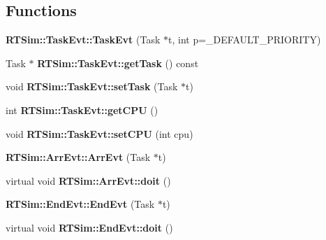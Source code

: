 \subsection*{Functions}
\begin{DoxyCompactItemize}
\item 
{\bfseries R\+T\+Sim\+::\+Task\+Evt\+::\+Task\+Evt} (Task $\ast$t, int p=\+\_\+\+D\+E\+F\+A\+U\+L\+T\+\_\+\+P\+R\+I\+O\+R\+I\+TY)\hypertarget{group__tasks_gacfc74e3c1903c6949275a254f1c1965f}{}\label{group__tasks_gacfc74e3c1903c6949275a254f1c1965f}

\item 
Task $\ast$ {\bfseries R\+T\+Sim\+::\+Task\+Evt\+::get\+Task} () const \hypertarget{group__tasks_gab1bac729570e6a83a603b7ebab6eaadd}{}\label{group__tasks_gab1bac729570e6a83a603b7ebab6eaadd}

\item 
void {\bfseries R\+T\+Sim\+::\+Task\+Evt\+::set\+Task} (Task $\ast$t)\hypertarget{group__tasks_ga019854b43c0548a0322cd12618aff533}{}\label{group__tasks_ga019854b43c0548a0322cd12618aff533}

\item 
int {\bfseries R\+T\+Sim\+::\+Task\+Evt\+::get\+C\+PU} ()\hypertarget{group__tasks_ga8035bdc8e6baa194d22ea1f368acbe98}{}\label{group__tasks_ga8035bdc8e6baa194d22ea1f368acbe98}

\item 
void {\bfseries R\+T\+Sim\+::\+Task\+Evt\+::set\+C\+PU} (int cpu)\hypertarget{group__tasks_ga5db1cc4b9325310784d8705ed49d1ced}{}\label{group__tasks_ga5db1cc4b9325310784d8705ed49d1ced}

\item 
{\bfseries R\+T\+Sim\+::\+Arr\+Evt\+::\+Arr\+Evt} (Task $\ast$t)\hypertarget{group__tasks_ga42754b618a61ab5e10a39d65adf09586}{}\label{group__tasks_ga42754b618a61ab5e10a39d65adf09586}

\item 
virtual void {\bfseries R\+T\+Sim\+::\+Arr\+Evt\+::doit} ()\hypertarget{group__tasks_ga394bb07e0b07ce45a646c1720db8a977}{}\label{group__tasks_ga394bb07e0b07ce45a646c1720db8a977}

\item 
{\bfseries R\+T\+Sim\+::\+End\+Evt\+::\+End\+Evt} (Task $\ast$t)\hypertarget{group__tasks_ga5fab411454535d203686e3d0ad905ad5}{}\label{group__tasks_ga5fab411454535d203686e3d0ad905ad5}

\item 
virtual void {\bfseries R\+T\+Sim\+::\+End\+Evt\+::doit} ()\hypertarget{group__tasks_gafe5c3e55b233c1f3f1bbcd15ab8ceeb3}{}\label{group__tasks_gafe5c3e55b233c1f3f1bbcd15ab8ceeb3}


\end{DoxyCompactItemize}
